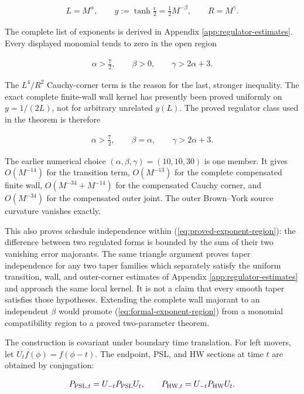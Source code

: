\begin{align}
L=M^\alpha,
\qquad
y:=\tanh\frac\epsilon2=\frac12M^{-\beta},
\qquad
R=M^\gamma . \label{eq:linked-schedule}
\end{align}

The complete list of exponents is derived in Appendix \ref{app:regulator-estimates}. Every displayed monomial tends to zero in the open region

\begin{align}
\alpha>\frac72,
\qquad
\beta>0,
\qquad
\gamma>2\alpha+3. \label{eq:formal-exponent-region}
\end{align}

The $L^4/R^2$ Cauchy-corner term is the reason for the last, stronger inequality. The exact complete finite-wall wall kernel has presently been proved uniformly on $y=1/(2L)$, not for arbitrary unrelated $y(L)$. The proved regulator class used in the theorem is therefore

\begin{align}
\alpha>\frac72,
\qquad
\beta=\alpha,
\qquad
\gamma>2\alpha+3. \label{eq:proved-exponent-region}
\end{align}

The earlier numerical choice $(\alpha,\beta,\gamma)=(10,10,30)$ is one member. It gives $O(M^{-14})$ for the transition term, $O(M^{-13})$ for the complete compensated finite wall, $O(M^{-34}+M^{-14})$ for the compensated Cauchy corner, and $O(M^{-34})$ for the compensated outer joint. The outer Brown--York source curvature vanishes exactly.

This also proves schedule independence within (\ref{eq:proved-exponent-region}): the difference between two regulated forms is bounded by the sum of their two vanishing error majorants. The same triangle argument proves taper independence for any two taper families which separately satisfy the uniform transition, wall, and outer-corner estimates of Appendix \ref{app:regulator-estimates} and approach the same local kernel. It is not a claim that every smooth taper satisfies those hypotheses. Extending the complete wall majorant to an independent $\beta$ would promote (\ref{eq:formal-exponent-region}) from a monomial compatibility region to a proved two-parameter theorem.

The construction is covariant under boundary time translation. For left movers, let $U_tf(\phi)=f(\phi-t)$. The endpoint, PSL, and HW sections at time $t$ are obtained by conjugation:

\begin{align}
P_{{\rm PSL},t}=U_{-t}P_{\rm PSL}U_t,
\qquad
P_{{\rm HW},t}=U_{-t}P_{\rm HW}U_t. \label{eq:time-sections}
\end{align}

